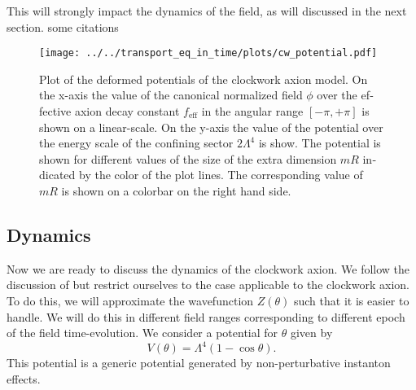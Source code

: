 \documentclass[master,       %
               twoside,        %
               BCOR10mm,       %
               english,ngerman, %
               ]{GAUBM}
\newcommand{\todo}[1]{{\color{magenta}{#1}}}
\begin{document}
\begin{otherlanguage}{english}
This will strongly impact the dynamics of the field, as will discussed in the next section.
\todo{TODO: derivation of boundary potentails, derivation of feff
put defintion of all used jacobi functions back in.}
some citations
\begin{figure}[H]
	\label{fig:clockwork_pot_plot}
    \texttt{[image: ../../transport\_eq\_in\_time/plots/cw\_potential.pdf]}
    \caption{Plot of the deformed potentials of the clockwork axion model. On the x-axis the value of the canonical normalized field $\phi$ over the effective axion decay constant $f_\mathrm{eff}$ in the angular range $[-\pi, +\pi]$ is shown on a linear-scale. On the y-axis the value of the potential over the energy scale of the confining sector $2 \Lambda^4$ is show. The potential is shown for different values of the size of the extra dimension $mR$ indicated by the color of the plot lines. The corresponding value of $mR$ is shown on a colorbar on the right hand side.}
\end{figure}

\subsection{Dynamics}
Now we are ready to discuss the dynamics of the clockwork axion.
We follow the discussion of \cite{Deformed_potential_Bae_2019} but restrict ourselves to the case applicable to the clockwork axion.
To do this, we will approximate the wavefunction $Z(\theta)$ such that it is easier to handle. We will do this in different field ranges corresponding to different epoch of the field time-evolution.
We consider a potential for $\theta$ given by
\begin{equation}
	V(\theta) = \Lambda^4(1 - \cos \theta).
\end{equation}
This potential is a generic potential generated by non-perturbative instanton effects.


\end{otherlanguage}
\end{document}
